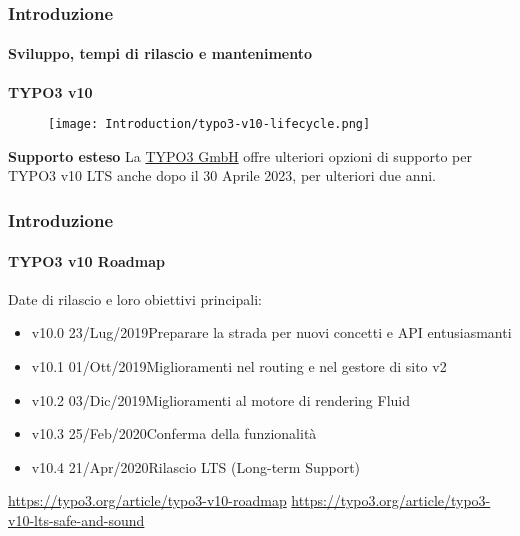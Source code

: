 
\begin{frame}[fragile]
	\frametitle{Introduzione}
	\framesubtitle{Sviluppo, tempi di rilascio e mantenimento}

	\textbf{TYPO3 v10}

	\begin{figure}
		\texttt{[image: Introduction/typo3-v10-lifecycle.png]}
	\end{figure}

	\textbf{Supporto esteso}\newline
	\smaller
		La \href{https://typo3.com}{TYPO3 GmbH} offre ulteriori opzioni di supporto
		per TYPO3 v10 LTS anche dopo il 30 Aprile 2023, per ulteriori due anni.
	\normalsize

\end{frame}


\begin{frame}[fragile]
	\frametitle{Introduzione}
	\framesubtitle{TYPO3 v10 Roadmap}

	Date di rilascio e loro obiettivi principali:

	\begin{itemize}

		\item v10.0 \tabto{1.1cm}23/Lug/2019\tabto{3.4cm}Preparare la strada per nuovi concetti e API entusiasmanti
		\item v10.1 \tabto{1.1cm}01/Ott/2019\tabto{3.4cm}Miglioramenti nel routing e nel gestore di sito v2
		\item v10.2 \tabto{1.1cm}03/Dic/2019\tabto{3.4cm}Miglioramenti al motore di rendering Fluid
		\item v10.3 \tabto{1.1cm}25/Feb/2020\tabto{3.4cm}Conferma della funzionalità
		\item
			\begingroup
				\color{typo3orange}
				v10.4 \tabto{1.1cm}21/Apr/2020\tabto{3.4cm}Rilascio LTS (Long-term Support)
			\endgroup

	\end{itemize}

	\vspace{0.6cm}
	\smaller
		\url{https://typo3.org/article/typo3-v10-roadmap}\newline
		\url{https://typo3.org/article/typo3-v10-lts-safe-and-sound}
	\normalsize

\end{frame}

